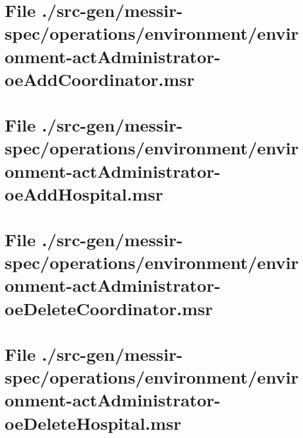 \section[File /src-gen/messir-spec.../environment-actAdministrator-oeAddCoordinator.msr]{File ./src-gen/messir-spec/operations/environment/environment-actAdministrator-oeAddCoordinator.msr}
\scriptsize

\normalsize
	
\section[File /src-gen/messir-spec.../environment-actAdministrator-oeAddHospital.msr]{File ./src-gen/messir-spec/operations/environment/environment-actAdministrator-oeAddHospital.msr}
\scriptsize

\normalsize
	
\section[File /src-gen.../environment-actAdministrator-oeDeleteCoordinator.msr]{File ./src-gen/messir-spec/operations/environment/environment-actAdministrator-oeDeleteCoordinator.msr}
\scriptsize

\normalsize
	
\section[File /src-gen/messir-spec.../environment-actAdministrator-oeDeleteHospital.msr]{File ./src-gen/messir-spec/operations/environment/environment-actAdministrator-oeDeleteHospital.msr}
\scriptsize

\normalsize
	
